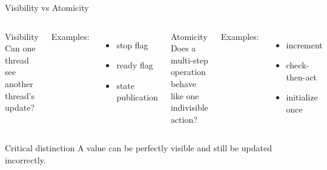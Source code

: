 \documentclass[aspectratio=169,11pt]{beamer}
\begin{document}
	\begin{frame}{Visibility vs Atomicity}
		\begin{columns}[T]
			\begin{block}{Visibility}
				Can one thread see another thread's update?
			\end{block}
			
			\vspace{0.2cm}
			
			Examples:
			\begin{itemize}
				\item stop flag
				\item ready flag
				\item state publication
			\end{itemize}
			
			\begin{block}{Atomicity}
				Does a multi-step operation behave like one indivisible action?
			\end{block}
			
			\vspace{0.2cm}
			
			Examples:
			\begin{itemize}
				\item increment
				\item check-then-act
				\item initialize once
			\end{itemize}
		\end{columns}
		
		\vspace{0.35cm}
		
		\begin{alertblock}{Critical distinction}
			A value can be perfectly visible and still be updated incorrectly.
		\end{alertblock}
	\end{frame}
	
\end{document}
